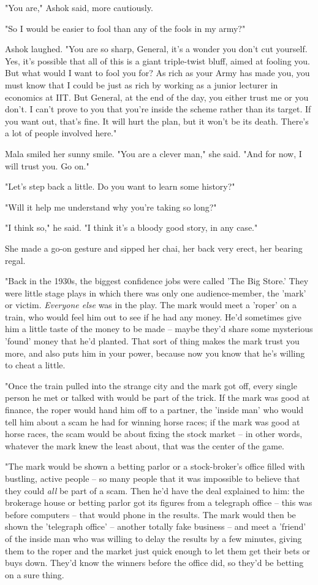 "You are," Ashok said, more cautiously.

"So I would be easier to fool than any of the fools in my army?"

Ashok laughed. "You are so sharp, General, it's a wonder you don't
cut yourself. Yes, it's possible that all of this is a giant
triple-twist bluff, aimed at fooling you. But what would I want to
fool you for? As rich as your Army has made you, you must know that
I could be just as rich by working as a junior lecturer in
economics at IIT. But General, at the end of the day, you either
trust me or you don't. I can't prove to you that you're inside the
scheme rather than its target. If you want out, that's fine. It
will hurt the plan, but it won't be its death. There's a lot of
people involved here."

Mala smiled her sunny smile. "You are a clever man," she said. "And
for now, I will trust you. Go on."

"Let's step back a little. Do you want to learn some history?"

"Will it help me understand why you're taking so long?"

"I think so," he said. "I think it's a bloody good story, in any
case."

She made a go-on gesture and sipped her chai, her back very erect,
her bearing regal.

"Back in the 1930s, the biggest confidence jobs were called 'The
Big Store.' They were little stage plays in which there was only
one audience-member, the 'mark' or victim. \emph{Everyone else} was
in the play. The mark would meet a 'roper' on a train, who would
feel him out to see if he had any money. He'd sometimes give him a
little taste of the money to be made -- maybe they'd share some
mysterious 'found' money that he'd planted. That sort of thing
makes the mark trust you more, and also puts him in your power,
because now you know that he's willing to cheat a little.

"Once the train pulled into the strange city and the mark got off,
every single person he met or talked with would be part of the
trick. If the mark was good at finance, the roper would hand him
off to a partner, the 'inside man' who would tell him about a scam
he had for winning horse races; if the mark was good at horse
races, the scam would be about fixing the stock market -- in other
words, whatever the mark knew the least about, that was the center
of the game.

"The mark would be shown a betting parlor or a stock-broker's
office filled with bustling, active people -- so many people that
it was impossible to believe that they could \emph{all} be part of
a scam. Then he'd have the deal explained to him: the brokerage
house or betting parlor got its figures from a telegraph office --
this was before computers -- that would phone in the results. The
mark would then be shown the 'telegraph office' -- another totally
fake business -- and meet a 'friend' of the inside man who was
willing to delay the results by a few minutes, giving them to the
roper and the market just quick enough to let them get their bets
or buys down. They'd know the winners before the office did, so
they'd be betting on a sure thing.


